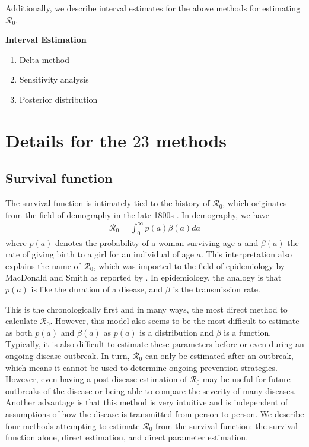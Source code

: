 \documentclass[12pt]{article}
\newcommand{\XX}{\ensuremath{23}} %
\newcommand{\rr}{\ensuremath{\mathcal{R}_0}}
\begin{document}
  Additionally, we describe  interval estimates for the above methods for estimating \rr.  
  
\textbf{Interval Estimation}
\begin{enumerate}
\item Delta method
\item Sensitivity analysis
  \item Posterior distribution
  \end{enumerate}






\section{Details for the $\XX$ methods}
\label{sec:details}
\subsection{Survival function}
\label{sec:direct}

The survival function is intimately tied to the history of \rr, which originates from the field of demography in the late 1800s \citep{dietz1993estimation}.  In demography, we have
\begin{align*}
\rr = \int_0^\infty p(a) \beta(a) da
\end{align*}
where $p(a)$ denotes the probability of a woman surviving age $a$ and $\beta(a)$ the rate of giving birth to a  girl for an individual of age $a$.  This interpretation also explains the name of \rr, which was imported to the field of epidemiology by MacDonald and Smith as reported by \cite{dietz1993estimation}.  In epidemiology, the analogy is that $p(a)$ is like the duration of a disease, and $\beta$ is the transmission rate.

This is the chronologically first and in many ways, the most direct method to calculate $\rr$.  However, this model also seems to be the most difficult to estimate as both $p(a)$ and $\beta (a)$ as $p(a)$ is a distribution and $\beta$ is a function.  Typically, it is also difficult to estimate these parameters before or even during an ongoing disease outbreak.  In turn, $\rr$ can only be estimated after an outbreak, which means it cannot be used to determine ongoing prevention strategies.  However, even having a post-disease estimation of $\rr$ may be useful for future outbreaks of the disease or being able to compare the severity of many diseases.  Another advantage is that this method is very intuitive and is independent of assumptions of how the disease is transmitted from person to person.    We describe four methods attempting to estimate $\rr$ from the survival function:  the survival function alone, direct estimation, and direct parameter estimation.
\end{document}
